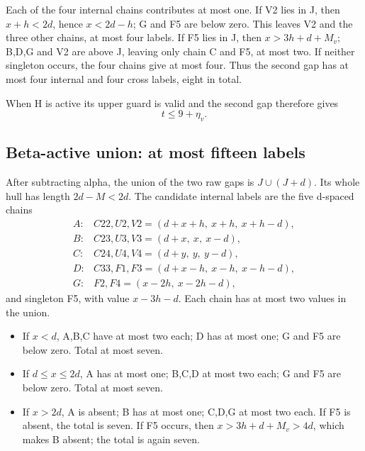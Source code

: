 \documentclass[10pt,a4paper]{article}
\theoremstyle{definition}
\providecommand{\tightlist}{\setlength{\itemsep}{0pt}\setlength{\parskip}{0pt}}
\begin{document}
Each of the four internal chains contributes at most one. If V2 lies in
J,\allowbreak{} then \(x+\allowbreak{}h<2d\),\allowbreak{} hence \(x<2d-h\); G and F5 are below zero. This
leaves V2 and the three other chains,\allowbreak{} at most four labels. If F5 lies in
J,\allowbreak{} then \(x>3h+\allowbreak{}d+\allowbreak{}M_v\); B,\allowbreak{}D,\allowbreak{}G and V2 are above J,\allowbreak{} leaving only chain C
and F5,\allowbreak{} at most two. If neither singleton occurs,\allowbreak{} the four chains give
at most four. Thus the second gap has at most four internal and four
cross labels,\allowbreak{} eight in total.

When H is active its upper guard is valid and the second gap therefore
gives \[
t\le9+\allowbreak{}\eta_v.\tag{2}
\]

\hypertarget{beta-active-union-at-most-fifteen-labels}{%
\subsection{Beta-active union: at most fifteen
labels}\label{beta-active-union-at-most-fifteen-labels}}

After subtracting alpha,\allowbreak{} the union of the two raw gaps is
\(J\cup(J+\allowbreak{}d)\). Its whole hull has length \(2d-M<2d\). The candidate
internal labels are the five d-spaced chains \[
\begin{array}{ll}
A:& C22,\allowbreak{}U2,\allowbreak{}V2=\allowbreak{}(d+\allowbreak{}x+\allowbreak{}h,\allowbreak{}\ x+\allowbreak{}h,\allowbreak{}\ x+\allowbreak{}h-d),\allowbreak{}\\
B:& C23,\allowbreak{}U3,\allowbreak{}V3=\allowbreak{}(d+\allowbreak{}x,\allowbreak{}\ x,\allowbreak{}\ x-d),\allowbreak{}\\
C:& C24,\allowbreak{}U4,\allowbreak{}V4=\allowbreak{}(d+\allowbreak{}y,\allowbreak{}\ y,\allowbreak{}\ y-d),\allowbreak{}\\
D:& C33,\allowbreak{}F1,\allowbreak{}F3=\allowbreak{}(d+\allowbreak{}x-h,\allowbreak{}\ x-h,\allowbreak{}\ x-h-d),\allowbreak{}\\
G:& F2,\allowbreak{}F4=\allowbreak{}(x-2h,\allowbreak{}\ x-2h-d),\allowbreak{}
\end{array}
\] and singleton F5,\allowbreak{} with value \(x-3h-d\). Each chain has at most two
values in the union.

\begin{itemize}
\tightlist
\item
  If \(x<d\),\allowbreak{} A,\allowbreak{}B,\allowbreak{}C have at most two each; D has at most one; G and F5
  are below zero. Total at most seven.
\item
  If \(d\le x\le2d\),\allowbreak{} A has at most one; B,\allowbreak{}C,\allowbreak{}D at most two each; G and
  F5 are below zero. Total at most seven.
\item
  If \(x>2d\),\allowbreak{} A is absent; B has at most one; C,\allowbreak{}D,\allowbreak{}G at most two each.
  If F5 is absent,\allowbreak{} the total is seven. If F5 occurs,\allowbreak{} then
  \(x>3h+\allowbreak{}d+\allowbreak{}M_v>4d\),\allowbreak{} which makes B absent; the total is again seven.
\end{itemize}
\end{document}

